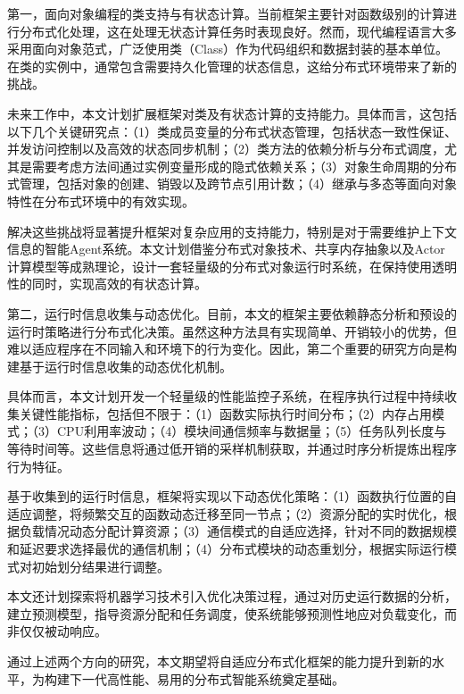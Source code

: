 第一，面向对象编程的类支持与有状态计算。当前框架主要针对函数级别的计算进行分布式化处理，这在处理无状态计算任务时表现良好。然而，现代编程语言大多采用面向对象范式，广泛使用类（Class）作为代码组织和数据封装的基本单位。在类的实例中，通常包含需要持久化管理的状态信息，这给分布式环境带来了新的挑战。

未来工作中，本文计划扩展框架对类及有状态计算的支持能力。具体而言，这包括以下几个关键研究点：（1）类成员变量的分布式状态管理，包括状态一致性保证、并发访问控制以及高效的状态同步机制；（2）类方法的依赖分析与分布式调度，尤其是需要考虑方法间通过实例变量形成的隐式依赖关系；（3）对象生命周期的分布式管理，包括对象的创建、销毁以及跨节点引用计数；（4）继承与多态等面向对象特性在分布式环境中的有效实现。

解决这些挑战将显著提升框架对复杂应用的支持能力，特别是对于需要维护上下文信息的智能Agent系统。本文计划借鉴分布式对象技术、共享内存抽象以及Actor计算模型等成熟理论，设计一套轻量级的分布式对象运行时系统，在保持使用透明性的同时，实现高效的有状态计算。

第二，运行时信息收集与动态优化。目前，本文的框架主要依赖静态分析和预设的运行时策略进行分布式化决策。虽然这种方法具有实现简单、开销较小的优势，但难以适应程序在不同输入和环境下的行为变化。因此，第二个重要的研究方向是构建基于运行时信息收集的动态优化机制。

具体而言，本文计划开发一个轻量级的性能监控子系统，在程序执行过程中持续收集关键性能指标，包括但不限于：（1）函数实际执行时间分布；（2）内存占用模式；（3）CPU利用率波动；（4）模块间通信频率与数据量；（5）任务队列长度与等待时间等。这些信息将通过低开销的采样机制获取，并通过时序分析提炼出程序行为特征。

基于收集到的运行时信息，框架将实现以下动态优化策略：（1）函数执行位置的自适应调整，将频繁交互的函数动态迁移至同一节点；（2）资源分配的实时优化，根据负载情况动态分配计算资源；（3）通信模式的自适应选择，针对不同的数据规模和延迟要求选择最优的通信机制；（4）分布式模块的动态重划分，根据实际运行模式对初始划分结果进行调整。

本文还计划探索将机器学习技术引入优化决策过程，通过对历史运行数据的分析，建立预测模型，指导资源分配和任务调度，使系统能够预测性地应对负载变化，而非仅仅被动响应。

通过上述两个方向的研究，本文期望将自适应分布式化框架的能力提升到新的水平，为构建下一代高性能、易用的分布式智能系统奠定基础。